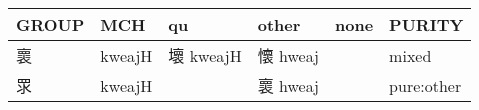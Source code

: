 \documentclass[14pt,a4paper]{scrartcl}
\begin{document}
\begin{longtable}[c]{@{}llllll@{}}
\toprule
\begin{minipage}[b]{0.14\columnwidth}\raggedright\strut
GROUP
\strut\end{minipage} &
\begin{minipage}[b]{0.14\columnwidth}\raggedright\strut
MCH
\strut\end{minipage} &
\begin{minipage}[b]{0.14\columnwidth}\raggedright\strut
qu
\strut\end{minipage} &
\begin{minipage}[b]{0.14\columnwidth}\raggedright\strut
other
\strut\end{minipage} &
\begin{minipage}[b]{0.14\columnwidth}\raggedright\strut
none
\strut\end{minipage} &
\begin{minipage}[b]{0.14\columnwidth}\raggedright\strut
PURITY
\strut\end{minipage}\tabularnewline
\midrule
\endhead
\begin{minipage}[t]{0.14\columnwidth}\raggedright\strut
褱
\strut\end{minipage} &
\begin{minipage}[t]{0.14\columnwidth}\raggedright\strut
kweajH
\strut\end{minipage} &
\begin{minipage}[t]{0.14\columnwidth}\raggedright\strut
壞 kweajH
\strut\end{minipage} &
\begin{minipage}[t]{0.14\columnwidth}\raggedright\strut
懷 hweaj
\strut\end{minipage} &
\begin{minipage}[t]{0.14\columnwidth}\raggedright\strut
\strut\end{minipage} &
\begin{minipage}[t]{0.14\columnwidth}\raggedright\strut
mixed
\strut\end{minipage}\tabularnewline
\begin{minipage}[t]{0.14\columnwidth}\raggedright\strut
眔
\strut\end{minipage} &
\begin{minipage}[t]{0.14\columnwidth}\raggedright\strut
kweajH
\strut\end{minipage} &
\begin{minipage}[t]{0.14\columnwidth}\raggedright\strut
\strut\end{minipage} &
\begin{minipage}[t]{0.14\columnwidth}\raggedright\strut
褱 hweaj
\strut\end{minipage} &
\begin{minipage}[t]{0.14\columnwidth}\raggedright\strut
\strut\end{minipage} &
\begin{minipage}[t]{0.14\columnwidth}\raggedright\strut
pure:other
\strut\end{minipage}\tabularnewline
\bottomrule
\end{longtable}
\end{document}
